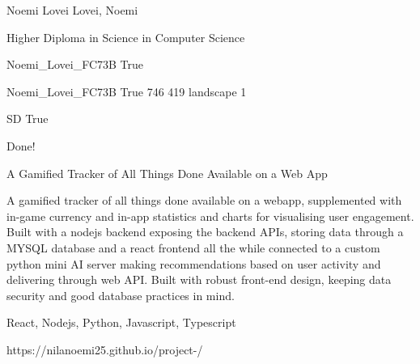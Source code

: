 
\begingroup{}\relax



\def\Key{Noemi_Lovei_FC73B}

{Noemi Lovei}
{Lovei, Noemi}

{Higher Diploma in Science in Computer Science}

{Noemi_Lovei_FC73B}
{True}

{Noemi_Lovei_FC73B}
{True}
{746}
{419}
{landscape}
{1}

{SD}
{True}

{Done!}

{A Gamified Tracker of All Things Done Available on a Web App}

{A gamified tracker of all things done available on a webapp, supplemented with in-game currency and in-app statistics and charts for visualising user engagement. Built with a nodejs backend exposing the backend APIs, storing data through a MYSQL database and a react frontend all the while connected to a custom python mini AI server making recommendations based on user activity and delivering through web API. Built with robust front-end design, keeping data security and good database practices in mind.}

{React, Nodejs, Python, Javascript, Typescript}

{https://nilanoemi25.github.io/project-/}

